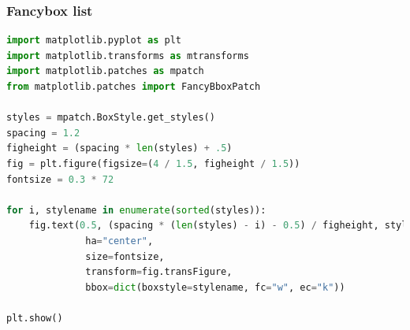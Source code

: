 \documentclass[UTF8,a4paper,12pt]{ctexart}  %
\begin{document}
\hypertarget{fancybox-list}{%
\subsubsection{Fancybox list}\label{fancybox-list}}

\begin{lstlisting}[language=Python]
import matplotlib.pyplot as plt
import matplotlib.transforms as mtransforms
import matplotlib.patches as mpatch
from matplotlib.patches import FancyBboxPatch

styles = mpatch.BoxStyle.get_styles()
spacing = 1.2
figheight = (spacing * len(styles) + .5)
fig = plt.figure(figsize=(4 / 1.5, figheight / 1.5))
fontsize = 0.3 * 72

for i, stylename in enumerate(sorted(styles)):
    fig.text(0.5, (spacing * (len(styles) - i) - 0.5) / figheight, stylename,
              ha="center",
              size=fontsize,
              transform=fig.transFigure,
              bbox=dict(boxstyle=stylename, fc="w", ec="k"))

plt.show()
\end{lstlisting}
\end{document}
